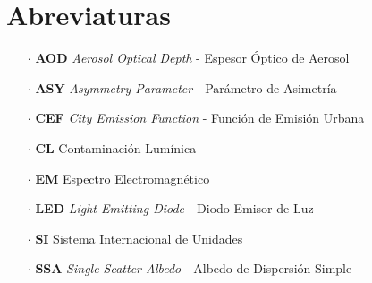 \chapter{Abreviaturas}

\begin{itemize}

\item[$\cdot$] \textbf{AOD} \textit{Aerosol Optical Depth} - Espesor Óptico de Aerosol

\item[$\cdot$] \textbf{ASY} \textit{Asymmetry Parameter} - Parámetro de Asimetría

\item[$\cdot$] \textbf{CEF} \textit{City Emission Function} - Función de Emisión Urbana

\item[$\cdot$] \textbf{CL} Contaminación Lumínica

\item[$\cdot$] \textbf{EM} Espectro Electromagnético

\item[$\cdot$] \textbf{LED} \textit{Light Emitting Diode} - Diodo Emisor de Luz

\item[$\cdot$] \textbf{SI} Sistema Internacional de Unidades

\item[$\cdot$] \textbf{SSA} \textit{Single Scatter Albedo} - Albedo de Dispersión Simple

			
\end{itemize}